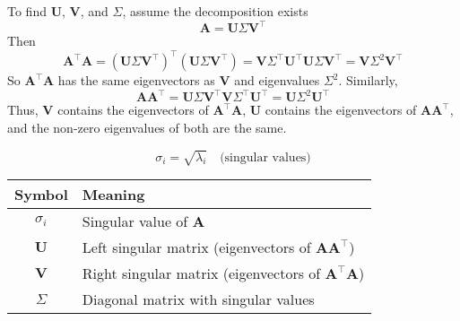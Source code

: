 To find $\mathbf{U}$, $\mathbf{V}$, and $\Sigma$, assume the decomposition exists
\[
\mathbf{A} = \mathbf{U} \Sigma \mathbf{V}^\top
\]
Then
\[
\mathbf{A}^\top \mathbf{A} = (\mathbf{U} \Sigma \mathbf{V}^\top)^\top (\mathbf{U} \Sigma \mathbf{V}^\top) = \mathbf{V} \Sigma^\top \mathbf{U}^\top \mathbf{U} \Sigma \mathbf{V}^\top = \mathbf{V} \Sigma^2 \mathbf{V}^\top
\]
So $\mathbf{A}^\top \mathbf{A}$ has the same eigenvectors as $\mathbf{V}$ and eigenvalues $\Sigma^2$. Similarly,
\[
\mathbf{A} \mathbf{A}^\top = \mathbf{U} \Sigma \mathbf{V}^\top \mathbf{V} \Sigma^\top \mathbf{U}^\top = \mathbf{U} \Sigma^2 \mathbf{U}^\top
\]
Thus, $\mathbf{V}$ contains the eigenvectors of $\mathbf{A}^\top \mathbf{A}$, $\mathbf{U}$ contains the eigenvectors of $\mathbf{A} \mathbf{A}^\top$, and the non-zero eigenvalues of both are the same.

\[
\sigma_i = \sqrt{\lambda_i} \quad \text{(singular values)}
\]

\begin{center}
\begin{tabular}{|c|l|}
\hline
Symbol & Meaning \\
\hline
$\sigma_i$ & Singular value of $\mathbf{A}$ \\
$\mathbf{U}$ & Left singular matrix (eigenvectors of $\mathbf{A} \mathbf{A}^\top$) \\
$\mathbf{V}$ & Right singular matrix (eigenvectors of $\mathbf{A}^\top \mathbf{A}$) \\
$\Sigma$ & Diagonal matrix with singular values \\
\hline
\end{tabular}
\end{center}
